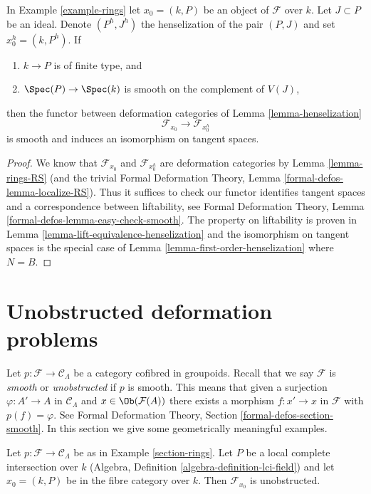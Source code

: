 \begin{lemma}
\label{lemma-smooth-henselization}
In Example \ref{example-rings} let $x_0 = (k, P)$ be an object
of $\mathcal{F}$ over $k$. Let $J \subset P$ be an ideal.
Denote $(P^h, J^h)$ the henselization of the pair $(P, J)$ and set
$x_0^h = (k, P^h)$. If
\begin{enumerate}
\item $k \to P$ is of finite type, and
\item $\Spec(P) \to \Spec(k)$ is smooth on the complement of $V(J)$,
\end{enumerate}
then the functor between deformation categories of
Lemma \ref{lemma-henselization}
$$
\mathcal{F}_{x_0} \longrightarrow \mathcal{F}_{x_0^h}
$$
is smooth and induces an isomorphism on tangent spaces.
\end{lemma}

\begin{proof}
We know that $\mathcal{F}_{x_0}$ and $\mathcal{F}_{x_0^h}$
are deformation categories by Lemma \ref{lemma-rings-RS}
(and the trivial Formal Deformation Theory, Lemma
\ref{formal-defos-lemma-localize-RS}). Thus it suffices to check
our functor identifies tangent spaces and a correspondence
between liftability, see
Formal Deformation Theory, Lemma \ref{formal-defos-lemma-easy-check-smooth}.
The property on liftability is proven in
Lemma \ref{lemma-lift-equivalence-henselization}
and the isomorphism on tangent spaces is the special case of
Lemma \ref{lemma-first-order-henselization} where $N = B$.
\end{proof}





\section{Unobstructed deformation problems}
\label{section-unobstructed}

\noindent
Let $p : \mathcal{F} \to \mathcal{C}_\Lambda$ be a
category cofibred in groupoids. Recall that we say $\mathcal{F}$
is {\it smooth} or {\it unobstructed} if $p$ is smooth.
This means that given a surjection $\varphi : A' \to A$ in
$\mathcal{C}_\Lambda$ and $x \in \Ob(\mathcal{F}(A))$
there exists a morphism $f : x' \to x$ in $\mathcal{F}$
with $p(f) = \varphi$.
See Formal Deformation Theory, Section \ref{formal-defos-section-smooth}.
In this section we give some geometrically meaningful examples.

\begin{lemma}
\label{lemma-lci-unobstructed}
Let $p : \mathcal{F} \to \mathcal{C}_\Lambda$ be as in
Example \ref{section-rings}. Let $P$ be a local complete
intersection over $k$ (Algebra, Definition \ref{algebra-definition-lci-field})
and let $x_0 = (k, P)$ be in the fibre category over $k$.
Then $\mathcal{F}_{x_0}$ is unobstructed.
\end{lemma}

